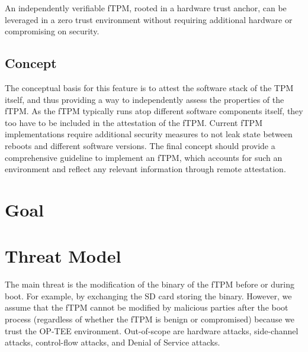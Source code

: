 An independently verifiable fTPM, rooted in a hardware trust anchor, can be leveraged in a zero trust environment without requiring additional hardware or compromising on security.


\subsection{Concept}
The conceptual basis for this feature is to attest the software stack of the TPM itself, and thus providing a way to independently assess the properties of the fTPM.
As the fTPM typically runs atop different software components itself, they too have to be included in the attestation of the fTPM.
Current fTPM implementations require additional security measures to not leak state between reboots and different software versions.
The final concept should provide a comprehensive guideline to implement an fTPM, which accounts for such an environment and reflect any relevant information through remote attestation.


\section{Goal}
\section{Threat Model}

The main threat is the modification of the binary of the fTPM before or during boot. For example, by exchanging the SD card storing the binary.
However, we assume that the fTPM cannot be modified by malicious parties after the boot process (regardless of whether the fTPM is benign or compromised) because we trust the OP-TEE environment.
Out-of-scope are hardware attacks, side-channel attacks, control-flow attacks, and Denial of Service attacks.



